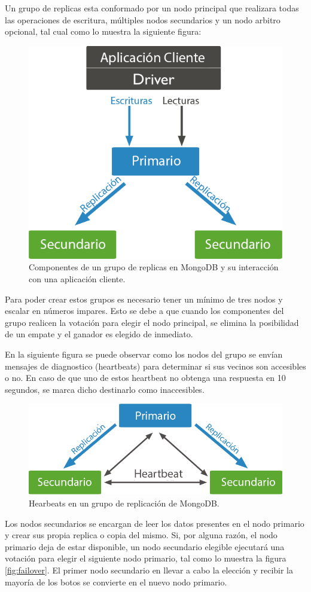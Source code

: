 Un grupo de replicas esta conformado por un nodo principal que realizara todas las operaciones de escritura, múltiples nodos 
secundarios y un nodo arbitro opcional, tal cual como lo muestra la siguiente figura:

\begin{figure}[H]
	\centering
		\includegraphics[width=.6\textwidth]{figures/replicas}
	\caption{Componentes de un grupo de replicas en MongoDB y su interacción con una aplicación cliente.}
	\label{fig:replicas}
\end{figure}

Para poder crear estos grupos es necesario tener un mínimo de tres nodos y escalar en números impares. Esto se 
debe a que cuando los componentes del grupo realicen la votación para elegir el nodo principal, se elimina la posibilidad de un
empate y el ganador es elegido de inmediato. 

En la siguiente figura se puede observar como los nodos del grupo se envían mensajes de diagnostico (heartbeats) para determinar
si sus vecinos son accesibles o no. En caso de que uno de estos heartbeat no obtenga una respuesta en 10 segundos, se marca dicho
destinarlo como inaccesibles.

\begin{figure}[H]
	\centering
		\includegraphics[width=.6\textwidth]{figures/heartbeat}
	\caption{Hearbeats en un grupo de replicación de MongoDB.}
	\label{fig:heartbeat}
\end{figure}


Los nodos secundarios se encargan de leer los datos presentes en el nodo primario y crear sus propia replica o copia del mismo.
Si, por alguna razón, el nodo primario deja de estar disponible, un nodo secundario elegible ejecutará una votación para 
elegir el siguiente nodo primario, tal como lo muestra la figura \ref{fig:failover}.
El primer nodo secundario en llevar a cabo la elección y recibir la mayoría de los botos se convierte en el nuevo nodo primario.


